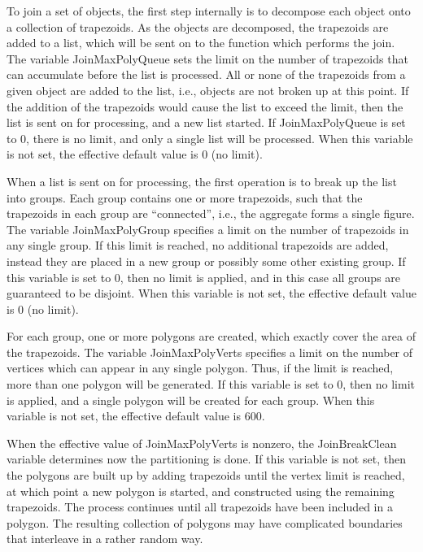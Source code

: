 To join a set of objects, the first step internally is to decompose
each object onto a collection of trapezoids.  As the objects are
decomposed, the trapezoids are added to a list, which will be sent on
to the function which performs the join.  The variable {\et
JoinMaxPolyQueue} sets the limit on the number of trapezoids that can
accumulate before the list is processed.  All or none of the
trapezoids from a given object are added to the list, i.e., objects
are not broken up at this point.  If the addition of the trapezoids
would cause the list to exceed the limit, then the list is sent on for
processing, and a new list started.  If {\et JoinMaxPolyQueue} is set
to 0, there is no limit, and only a single list will be processed. 
When this variable is not set, the effective default value is 0 (no
limit).

When a list is sent on for processing, the first operation is to break
up the list into groups.  Each group contains one or more trapezoids,
such that the trapezoids in each group are ``connected'', i.e., the
aggregate forms a single figure.  The variable {\et JoinMaxPolyGroup}
specifies a limit on the number of trapezoids in any single group.  If
this limit is reached, no additional trapezoids are added, instead
they are placed in a new group or possibly some other existing group. 
If this variable is set to 0, then no limit is applied, and in this
case all groups are guaranteed to be disjoint.  When this variable is
not set, the effective default value is 0 (no limit).

For each group, one or more polygons are created, which exactly cover
the area of the trapezoids.  The variable {\et JoinMaxPolyVerts}
specifies a limit on the number of vertices which can appear in any
single polygon.  Thus, if the limit is reached, more than one polygon
will be generated.  If this variable is set to 0, then no limit is
applied, and a single polygon will be created for each group.  When
this variable is not set, the effective default value is 600.

When the effective value of {\et JoinMaxPolyVerts} is nonzero, the
{\et JoinBreakClean} variable determines now the partitioning is done. 
If this variable is not set, then the polygons are built up by adding
trapezoids until the vertex limit is reached, at which point a new
polygon is started, and constructed using the remaining trapezoids. 
The process continues until all trapezoids have been included in a
polygon.  The resulting collection of polygons may have complicated
boundaries that interleave in a rather random way.

